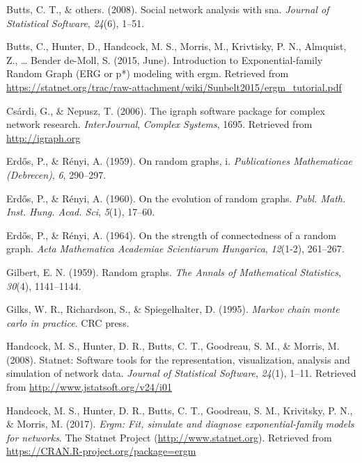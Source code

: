 \documentclass[12pt,twoside]{amherstthesis}
\begin{document}
  \hypertarget{ref-butts2008social}{}
  Butts, C. T., \& others. (2008). Social network analysis with sna.
  \emph{Journal of Statistical Software}, \emph{24}(6), 1--51.
  
  \hypertarget{ref-butts_introduction_2015}{}
  Butts, C., Hunter, D., Handcock, M. S., Morris, M., Krivtisky, P. N.,
  Almquist, Z., \ldots{} Bender de-Moll, S. (2015, June). Introduction to
  Exponential-family Random Graph (ERG or p*) modeling with ergm.
  Retrieved from
  \url{https://statnet.org/trac/raw-attachment/wiki/Sunbelt2015/ergm_tutorial.pdf}
  
  \hypertarget{ref-igraphpackage}{}
  Csárdi, G., \& Nepusz, T. (2006). The igraph software package for
  complex network research. \emph{InterJournal}, \emph{Complex Systems},
  1695. Retrieved from \url{http://igraph.org}
  
  \hypertarget{ref-erdos1959random}{}
  Erd\H{o}s, P., \& Rényi, A. (1959). On random graphs, i.
  \emph{Publicationes Mathematicae (Debrecen)}, \emph{6}, 290--297.
  
  \hypertarget{ref-erdos1960evolution}{}
  Erd\H{o}s, P., \& Rényi, A. (1960). On the evolution of random graphs.
  \emph{Publ. Math. Inst. Hung. Acad. Sci}, \emph{5}(1), 17--60.
  
  \hypertarget{ref-erdHos1964strength}{}
  Erd\H{o}s, P., \& Rényi, A. (1964). On the strength of connectedness of
  a random graph. \emph{Acta Mathematica Academiae Scientiarum Hungarica},
  \emph{12}(1-2), 261--267.
  
  \hypertarget{ref-gilbert1959random}{}
  Gilbert, E. N. (1959). Random graphs. \emph{The Annals of Mathematical
  Statistics}, \emph{30}(4), 1141--1144.
  
  \hypertarget{ref-gilks1995markov}{}
  Gilks, W. R., Richardson, S., \& Spiegelhalter, D. (1995). \emph{Markov
  chain monte carlo in practice}. CRC press.
  
  \hypertarget{ref-statnetpackagearticle}{}
  Handcock, M. S., Hunter, D. R., Butts, C. T., Goodreau, S. M., \&
  Morris, M. (2008). Statnet: Software tools for the representation,
  visualization, analysis and simulation of network data. \emph{Journal of
  Statistical Software}, \emph{24}(1), 1--11. Retrieved from
  \url{http://www.jstatsoft.org/v24/i01}
  
  \hypertarget{ref-ergmpackagemanual}{}
  Handcock, M. S., Hunter, D. R., Butts, C. T., Goodreau, S. M.,
  Krivitsky, P. N., \& Morris, M. (2017). \emph{Ergm: Fit, simulate and
  diagnose exponential-family models for networks}. The Statnet Project
  (\url{http://www.statnet.org}). Retrieved from
  \url{https://CRAN.R-project.org/package=ergm}
  
\end{document}
